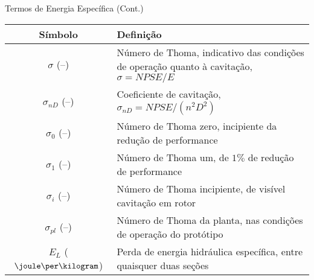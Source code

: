     \begin{frame}{Termos de Energia Específica (Cont.)}\vspace*{-1em}
        \setlength{\tabcolsep}{2mm}
        \noindent\begin{longtable}{cp{110mm}}
            \alert{Símbolo} & \alert{Definição} \\
            \hline
            $\sigma$ (--) &
            Número de Thoma, indicativo das condições de operação quanto à cavitação,
            \alert{$\sigma = NPSE / E$} \\
            $\sigma_{nD}$ (--) &
            Coeficiente de cavitação, \alert{$\sigma_{nD} = NPSE / (n^2D^2)$} \\
            $\sigma_0$ (--) &
            Número de Thoma zero, incipiente da redução de performance \\
            $\sigma_1$ (--) &
            Número de Thoma um, de $1\%$ de redução de performance \\
            $\sigma_i$ (--) &
            Número de Thoma incipiente, de visível cavitação em rotor \\
            $\sigma_{pl}$ (--) &
            Número de Thoma da planta, nas condições de operação do protótipo \\
            $E_L$ ($\joule\per\kilogram$) &
            Perda de energia hidráulica específica, entre quaisquer duas seções \\
            \hline
        \end{longtable}
    \end{frame}

    \begin{frame}\vspace*{-1em}
    \end{frame}

    \begin{frame}\vspace*{-1em}
    \end{frame}

